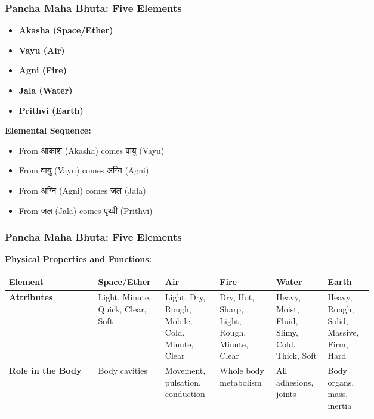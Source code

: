 \begin{frame}[fragile]\frametitle{Pancha Maha Bhuta: Five Elements}


    \begin{itemize}
        \item \textbf{Akasha (Space/Ether)}
        \item \textbf{Vayu (Air)}
        \item \textbf{Agni (Fire)}
        \item \textbf{Jala (Water)}
        \item \textbf{Prithvi (Earth)}
    \end{itemize}
	
    \textbf{Elemental Sequence:}
	
    \begin{itemize}
        \item From आकाश (Akasha) comes वायु (Vayu)
        \item From वायु (Vayu) comes अग्नि (Agni)
        \item From अग्नि (Agni) comes जल (Jala)
        \item From जल (Jala) comes पृथ्वी (Prithvi)
    \end{itemize}
	
\end{frame}

\begin{frame}[fragile]\frametitle{Pancha Maha Bhuta: Five Elements}

    \textbf{Physical Properties and Functions:}
	
	
        \begin{tabular}{|p{0.21\linewidth}|p{0.1\linewidth}|p{0.1\linewidth}|p{0.1\linewidth}|p{0.1\linewidth}|p{0.1\linewidth}|}
    \hline
    \textbf{Element} & \textbf{Space/Ether} & \textbf{Air} & \textbf{Fire} & \textbf{Water} & \textbf{Earth} \\
    \hline
    \textbf{Attributes} & Light, Minute, Quick, Clear, Soft & Light, Dry, Rough, Mobile, Cold, Minute, Clear & Dry, Hot, Sharp, Light, Rough, Minute, Clear & Heavy, Moist, Fluid, Slimy, Cold, Thick, Soft & Heavy, Rough, Solid, Massive, Firm, Hard \\
    \hline
    \textbf{Role in the Body} & Body cavities & Movement, pulsation, conduction & Whole body metabolism & All adhesions, joints & Body organs, mass, inertia \\
    \hline
    \end{tabular}

\end{frame}


